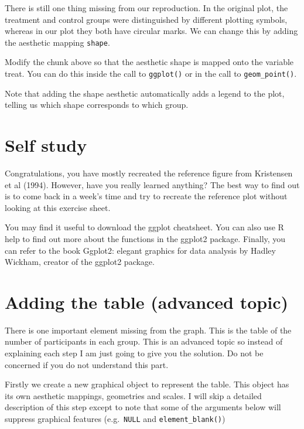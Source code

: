 \documentclass[
]{book}
\begin{document}
There is still one thing missing from our reproduction. In the original plot, the treatment and control groups were distinguished by different plotting symbols, whereas in our plot they both have circular marks. We can change this by adding the aesthetic mapping \texttt{shape}.

Modify the chunk above so that the aesthetic shape is mapped onto the variable treat. You can do this inside the call to \texttt{ggplot()} or in the call to \texttt{geom\_point()}.

Note that adding the shape aesthetic automatically adds a legend to the plot, telling us which shape corresponds to which group.

\section{Self study}\label{self-study}

Congratulations, you have mostly recreated the reference figure from Kristensen et al (1994). However, have you really learned anything? The best way to find out is to come back in a week's time and try to recreate the reference plot without looking at this exercise sheet.

You may find it useful to download the ggplot cheatsheet. You can also use R help to find out more about the functions in the ggplot2 package. Finally, you can refer to the book Ggplot2: elegant graphics for data analysis by Hadley Wickham, creator of the ggplot2 package.

\section{Adding the table (advanced topic)}\label{adding-the-table-advanced-topic}

There is one important element missing from the graph. This is the table of the number of participants in each group. This is an advanced topic so instead of explaining each step I am just going to give you the solution. Do not be concerned if you do not understand this part.

Firstly we create a new graphical object to represent the table. This object has its own aesthetic mappings, geometries and scales. I will skip a detailed description of this step except to note that some of the arguments below will suppress graphical features (e.g.~\texttt{NULL} and \texttt{element\_blank()})
\end{document}
